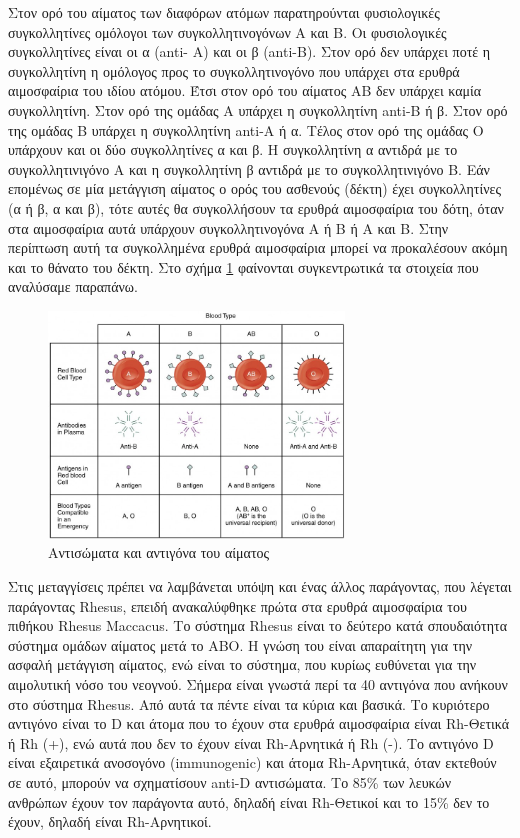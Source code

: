 			Στον ορό του αίματος των διαφόρων ατόμων παρατηρούνται φυσιολογικές συγκολλητίνες ομόλογοι των συγκολλητινογόνων Α και Β. Οι φυσιολογικές συγκολλητίνες είναι οι α (anti- A) και οι β (anti-B). Στον ορό δεν υπάρχει ποτέ η συγκολλητίνη η ομόλογος προς το συγκολλητινογόνο που υπάρχει στα ερυθρά αιμοσφαίρια του ιδίου ατόμου. Έτσι στον ορό του αίματος ΑΒ δεν υπάρχει καμία συγκολλητίνη. Στον ορό της ομάδας Α υπάρχει η συγκολλητίνη anti-B ή β. Στον ορό της ομάδας Β υπάρχει η συγκολλητίνη anti-Α ή α. Τέλος στον ορό της ομάδας Ο υπάρχουν και οι δύο συγκολλητίνες α και β. Η συγκολλητίνη α αντιδρά με το συγκολλητινιγόνο Α και η συγκολλητίνη β αντιδρά με το συγκολλητινιγόνο Β. Εάν επομένως σε μία μετάγγιση αίματος ο ορός του ασθενούς (δέκτη) έχει συγκολλητίνες (α ή β, α και β), τότε αυτές θα συγκολλήσουν τα ερυθρά αιμοσφαίρια του δότη, όταν στα αιμοσφαίρια αυτά υπάρχουν συγκολλητινογόνα Α ή Β ή Α και Β. Στην περίπτωση αυτή τα συγκολλημένα ερυθρά αιμοσφαίρια μπορεί να προκαλέσουν ακόμη και το θάνατο του δέκτη. Στο σχήμα \ref{fig:blood_antibodies_antigons} φαίνονται συγκεντρωτικά τα στοιχεία που αναλύσαμε παραπάνω.		
	\begin{figure}[h!]
	    \centering
	    \includegraphics[width=0.7\textwidth]{blood_antibodies_antigons.jpg}
	    \caption{Αντισώματα και αντιγόνα του αίματος}
	    \label{fig:blood_antibodies_antigons}
	\end{figure}
			
			Στις μεταγγίσεις πρέπει να λαμβάνεται υπόψη και ένας άλλος
παράγοντας, που λέγεται παράγοντας Rhesus, επειδή ανακαλύφθηκε πρώτα στα ερυθρά
αιμοσφαίρια του πιθήκου Rhesus Maccacus. Το σύστημα Rhesus είναι το δεύτερο κατά
σπουδαιότητα σύστημα ομάδων αίματος μετά το ΑΒΟ. Η γνώση του είναι απαραίτητη για
την ασφαλή μετάγγιση αίματος, ενώ είναι το σύστημα, που κυρίως ευθύνεται για την
αιμολυτική νόσο του νεογνού. Σήμερα είναι γνωστά περί τα 40 αντιγόνα που ανήκουν στο
σύστημα Rhesus. Από αυτά τα πέντε είναι τα κύρια και βασικά. Το κυριότερο αντιγόνο είναι
το D και άτομα που το έχουν στα ερυθρά αιμοσφαίρια είναι Rh-Θετικά ή Rh (+), ενώ αυτά
που δεν το έχουν είναι Rh-Αρνητικά ή Rh (-). Το αντιγόνο D είναι εξαιρετικά ανοσογόνο
(immunogenic) και άτομα Rh-Αρνητικά, όταν εκτεθούν σε αυτό, μπορούν να σχηματίσουν
anti-D αντισώματα. Το 85\% των λευκών ανθρώπων έχουν τον παράγοντα αυτό, δηλαδή είναι
Rh-Θετικοί και το 15\% δεν το έχουν, δηλαδή είναι Rh-Αρνητικοί. 

